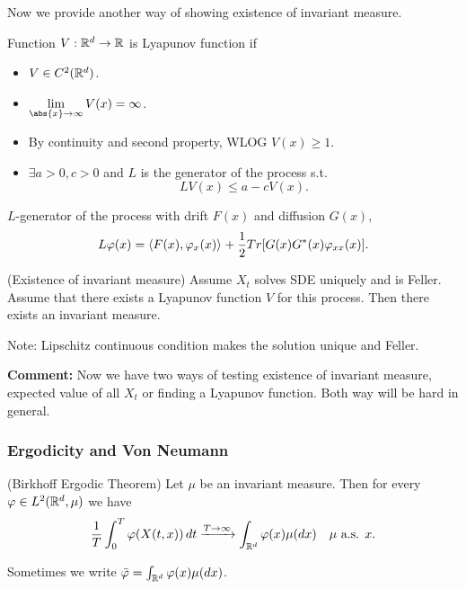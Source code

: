 Now we provide another way of showing existence of invariant measure.
\begin{dfn}\label{Lyapunov} Function $V: \mathbb{R}^d \rightarrow \mathbb{R}$ is Lyapunov function if
\begin{itemize}
    \item $V \in C^2(\mathbb{R}^d)$.
    \item $\biglim{\abs{x}\rightarrow \infty} V(x) = \infty$.
    \item By continuity and second property, WLOG $V(x) \geq 1$.
    \item $\exists a>0, c>0$ and $L$ is the generator of the process s.t.
    \begin{equation*}
        L V(x) \leq a - c V(x).
    \end{equation*}
\end{itemize}
\end{dfn} $L$-generator of the process with drift $F(x)$ and diffusion $G(x)$,
\begin{equation*}
    L\varphi(x) = \langle{F(x), \varphi_x(x)} \rangle_{} + \frac{1}{2} Tr[G(x) G^*(x) \varphi_{xx}(x)].
\end{equation*}
\begin{thm}{(Existence of invariant measure)}
Assume $X_t$ solves SDE uniquely and is Feller. Assume that there exists a Lyapunov function $V$ for this process. Then there exists an invariant measure.
\end{thm}
Note: Lipschitz continuous condition makes the solution unique and Feller.

\textbf{Comment: } Now we have two ways of testing existence of invariant measure, expected value of all $X_t$ or finding a Lyapunov function. Both way will be hard in general.

\subsubsection{Ergodicity and Von Neumann}

\begin{thm}{(Birkhoff Ergodic Theorem)}\label{Thm: BET}
Let $\mu$ be an invariant measure. Then for every $\varphi\in L^{2}(\mathbb{R}^d, \mu)$ we have
\begin{equation*}
    \frac{1}{T} \int_0^T \varphi(X(t,x)) \mathop{}\!d t \xrightarrow{T\rightarrow \infty} \int_{\mathbb{R}^d} \varphi(x) \mu(\mathop{}\!d x) \quad \mu \text{ a.s. } x.
\end{equation*}
\end{thm}
Sometimes we write $\bar{\varphi} = \int_{\mathbb{R}^d} \varphi(x) \mu(\mathop{}\!d x)$.

